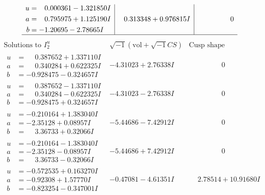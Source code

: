 \documentclass[1p]{elsarticle_modified}
\theoremstyle{definition}
\newcommand{\I}{\sqrt{-1}}
\begin{document}
$$\begin{array}{c|c|c}
\begin{aligned}
u &= \phantom{-}0.000361 - 1.321850 I \\
a &= \phantom{-}0.795975 + 1.125190 I \\
b &= -1.20695 - 2.78665 I\end{aligned}
 & \phantom{-}0.313348 + 0.976815 I & \phantom{-0.000000 } 0\\
 \hline 
 \end{array}$$\newpage$$\begin{array}{c|c|c}  
\text{Solutions to }I^u_{2}& \I (\text{vol} + \sqrt{-1}CS) & \text{Cusp shape}\\
 \hline 
\begin{aligned}
u &= \phantom{-}0.387652 + 1.337110 I \\
a &= \phantom{-}0.340284 + 0.622325 I \\
b &= -0.928475 - 0.324657 I\end{aligned}
 & -4.31023 + 2.76338 I & \phantom{-0.000000 } 0 \\ \hline\begin{aligned}
u &= \phantom{-}0.387652 - 1.337110 I \\
a &= \phantom{-}0.340284 - 0.622325 I \\
b &= -0.928475 + 0.324657 I\end{aligned}
 & -4.31023 - 2.76338 I & \phantom{-0.000000 } 0 \\ \hline\begin{aligned}
u &= -0.210164 + 1.383040 I \\
a &= -2.35128 + 0.08957 I \\
b &= \phantom{-}3.36733 + 0.32066 I\end{aligned}
 & -5.44686 - 7.42912 I & \phantom{-0.000000 } 0 \\ \hline\begin{aligned}
u &= -0.210164 - 1.383040 I \\
a &= -2.35128 - 0.08957 I \\
b &= \phantom{-}3.36733 - 0.32066 I\end{aligned}
 & -5.44686 + 7.42912 I & \phantom{-0.000000 } 0 \\ \hline\begin{aligned}
u &= -0.572535 + 0.163270 I \\
a &= -0.92308 + 1.57770 I \\
b &= -0.823254 - 0.347001 I\end{aligned}
 & -0.47081 - 4.61351 I & \phantom{-}2.78514 + 10.91680 I \\ \hline\begin{aligned}

\end{aligned}
\end{array}$$
\end{document}
